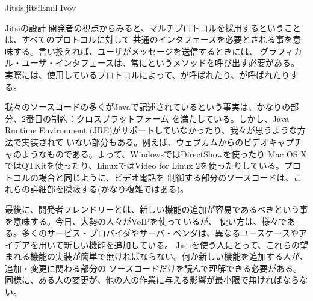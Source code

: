 \begin{aosachapter}{Jitsi}{s:jitsi}{Emil Ivov}
\begin{aosasect1}{Jitsiの設計}
開発者の視点からみると、マルチプロトコルを採用するということは、すべてのプロトコルに対して
共通のインタフェースを必要とされる事を意味する。言い換えれば、ユーザがメッセージを送信するときには、
グラフィカル・ユーザ・インタフェースは、常にというメソッドを呼び出す必要がある。
実際には、使用しているプロトコルによって、が呼ばれたり、が呼ばれたりする。

我々のソースコードの多くがJavaで記述されているという事実は、かなりの部分、2番目の制約：クロスプラットフォーム
を満たしている。しかし、Java Runtime Environment (JRE)がサポートしていなかったり、我々が思うような方法で実装されて
いない部分もある。例えば、ウェブカムからのビデオキャプチャのようなものである。よって、WindowsではDirectShowを使ったり
Mac OS XではQTKitを使ったり、LinuxではVideo for Linux 2を使ったりしている。プロトコルの場合と同じように、ビデオ電話を
制御する部分のソースコードは、これらの詳細部を隠蔽する(かなり複雑ではある)。

最後に、開発者フレンドリーとは、新しい機能の追加が容易であるべきという事を意味する。今日、大勢の人々がVoIPを使っているが、
使い方は、様々である。多くのサービス・プロバイダやサーバ・ベンダは、異なるユースケースやアイデアを用いて新しい機能を追加している。
Jistiを使う人にとって、これらの望まれる機能の実装が簡単で無ければならない。何か新しい機能を追加する人が、追加・変更に関わる部分の
ソースコードだけを読んで理解できる必要がある。同様に、ある人の変更が、他の人の作業に与える影響が最小限で無ければならない。


\end{aosasect1}
\end{aosachapter}

